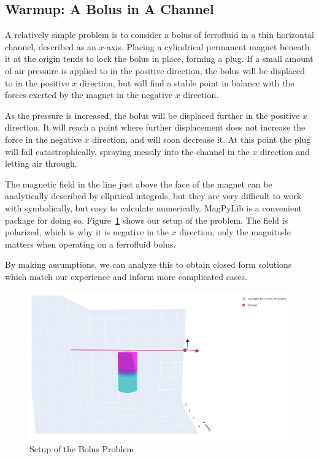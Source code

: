 \documentclass[]{asme2ej}
\begin{document}
\subsection{Warmup: A Bolus in A Channel}

A relatively simple problem is to consider a bolus of
ferrofluid in a thin horizontal channel, described as an $x$-axis.
Placing a cylindrical permanent
magnet beneath it at the origin tends to lock the bolus in place,
forming a plug.
If a small amount of air pressure is applied to in the positive direction,
the bolus will
be displaced to in the positive $x$ direction, but will find a
stable point in balance with the forces exerted by the magnet in
the negative $x$ direction.

As the pressure is increased, the bolus will be displaced further
in the positive $x$ direction.
It will reach a point where further displacement does not increase
the force in the negative $x$ direction, and will soon decrease it.
At this point the plug will fail
catastrophically, spraying messily into the channel in the $x$ direction and letting air through.

The magnetic field in the line just above the face of the magnet can be analytically
described by ellpitical integrals, but they are very difficult to work with symbolically,
but easy to calculate numerically.
MagPyLib is a convenient package for doing so.
Figure~\ref{fig:BolusSetup} shows our setup of the problem.
The field is polarized, which is why it is negative in the $x$ direction, only
the magnitude matters when
operating on a ferrofluid bolus.

By making assumptions, we can
analyze this to obtain closed form solutions which match our
experience and inform more complicated cases.



\begin{figure}
\centerline{\includegraphics[width=6in]{figure/SetupBolusProblem.png}}
\caption{Setup of the Bolus Problem}
\label{fig:BolusSetup}
\end{figure}
\end{document}
